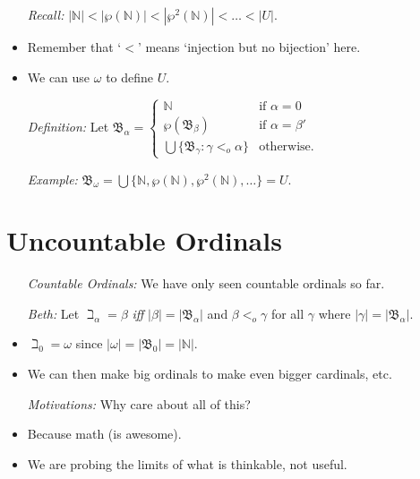 \documentclass[a4paper, 11pt]{article} %
\newcommand{\set}[1]{\lbrace#1\rbrace} %
\newcommand{\abs}[1]{|#1|} %
\newcommand{\N}{\mathbb{N}}
\newcommand{\B}{\mathfrak{B}}
\begin{document}
\begin{itemize}
  \item[\it Recall:] $\abs{\N} < \abs{\wp(\N)} < \abs{\wp^2(\N)} < \ldots < \abs{U}$. 
    \item Remember that `$<$' means `injection but no bijection' here.
    \item We can use $\omega$ to define $U$.
  \item[\it Definition:] Let $\B_\alpha = 
    \begin{cases}
      \N                                            & \text{if } \alpha = 0\\
      \wp(\B_\beta)                                 & \text{if } \alpha = \beta'\\
      \bigcup \set{ \B_\gamma : \gamma <_o \alpha } & \text{otherwise.} 
    \end{cases}$
  \item[\it Example:] $\B_\omega = \bigcup \set{\N,\wp(\N),\wp^2(\N),\ldots} = U$.
\end{itemize}



\section*{Uncountable Ordinals}

\begin{itemize}
  \item[\it Countable Ordinals:] We have only seen countable ordinals so far. 
  \item[\it Beth:] Let $\beth_\alpha = \beta$ \textit{iff} $\abs{\beta} = \abs{\B_\alpha}$ and $\beta <_o \gamma$ for all $\gamma$ where $\abs{\gamma} = \abs{\B_\alpha}$. 
    \item $\beth_0 = \omega$ since $\abs{\omega} = \abs{\B_0} = \abs{\N}$.
    \item We can then make big ordinals to make even bigger cardinals, etc.
  \item[\it Motivations:] Why care about all of this?
    \item Because math (is awesome).
    \item We are probing the limits of what is thinkable, not useful.
\end{itemize}
\end{document}
